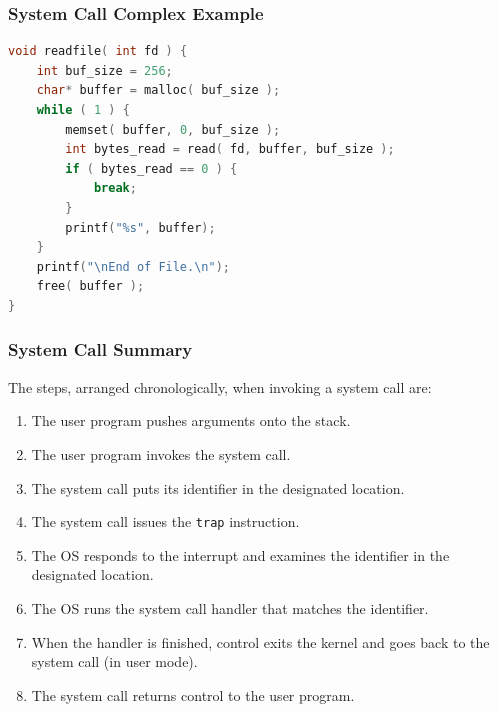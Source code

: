 \begin{frame}[fragile]
\frametitle{System Call Complex Example}

\begin{lstlisting}[language=C]
void readfile( int fd ) {
    int buf_size = 256;
    char* buffer = malloc( buf_size );
    while ( 1 ) {
        memset( buffer, 0, buf_size );
        int bytes_read = read( fd, buffer, buf_size );  
        if ( bytes_read == 0 ) {
            break; 
        }     
        printf("%s", buffer);
    }
    printf("\nEnd of File.\n");
    free( buffer );
}
\end{lstlisting}


\end{frame}


\begin{frame}
\frametitle{System Call Summary}

The steps, arranged chronologically, when invoking a system call are:
\begin{enumerate}
	\item The user program pushes arguments onto the stack.
	\item The user program invokes the system call.
	\item The system call puts its identifier in the designated location.
	\item The system call issues the \texttt{trap} instruction.
	\item The OS responds to the interrupt and examines the identifier in the designated location.
	\item The OS runs the system call handler that matches the identifier.
	\item When the handler is finished, control exits the kernel and goes back to the system call (in user mode).
	\item The system call returns control to the user program.

\end{enumerate}


\end{frame}







